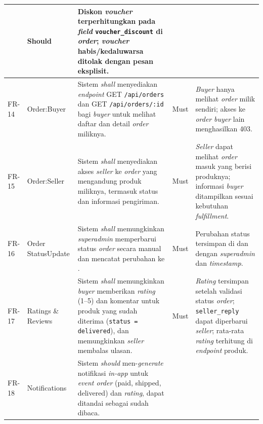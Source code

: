 \begin{longtable}{|L{0.9cm}|L{2.7cm}|L{5.5cm}|L{1.3cm}|L{4.6cm}|}
        & Should
        & Diskon \textit{voucher} terperhitungkan pada \textit{field}
          \texttt{voucher\_discount} di \textit{order}; \textit{voucher}
          habis/kedaluwarsa ditolak dengan pesan eksplisit. \\
    \hline
    FR-14
        & Order:\newline Buyer
        & Sistem \textit{shall} menyediakan \textit{endpoint} GET
          \texttt{/api/orders} dan GET \texttt{/api/orders/:id} bagi \textit{buyer}
          untuk melihat daftar dan detail \textit{order} miliknya.
        & Must
        & \textit{Buyer} hanya melihat \textit{order} milik sendiri; akses ke
          \textit{order} \textit{buyer} lain menghasilkan 403. \\
    \hline
    FR-15
        & Order:\newline Seller
        & Sistem \textit{shall} menyediakan akses \textit{seller} ke \textit{order}
          yang mengandung produk miliknya, termasuk status dan informasi pengiriman.
        & Must
        & \textit{Seller} dapat melihat \textit{order} masuk yang berisi
          produknya; informasi \textit{buyer} ditampilkan sesuai kebutuhan
          \textit{fulfillment}. \\
    \hline
    FR-16
        & Order Status\newline Update
        & Sistem \textit{shall} memungkinkan \textit{superadmin} memperbarui
          status \textit{order} secara manual dan mencatat perubahan ke
          .
        & Must
        & Perubahan status tersimpan di  dan
           dengan 
          \textit{superadmin} dan \textit{timestamp}. \\
    \hline
    FR-17
        & Ratings \& Reviews
        & Sistem \textit{shall} memungkinkan \textit{buyer} memberikan
          \textit{rating} (1--5) dan komentar untuk produk yang sudah diterima
          (\texttt{status = delivered}), dan memungkinkan \textit{seller} membalas
          ulasan.
        & Must
        & \textit{Rating} tersimpan setelah validasi status \textit{order};
          \texttt{seller\_reply} dapat diperbarui \textit{seller}; rata-rata
          \textit{rating} terhitung di \textit{endpoint} produk. \\
    \hline
    FR-18
        & Notifications
        & Sistem \textit{should} men-\textit{generate} notifikasi \textit{in-app}
          untuk \textit{event order} (paid, shipped, delivered) dan \textit{rating},
          dapat ditandai sebagai sudah dibaca.

\end{longtable}
